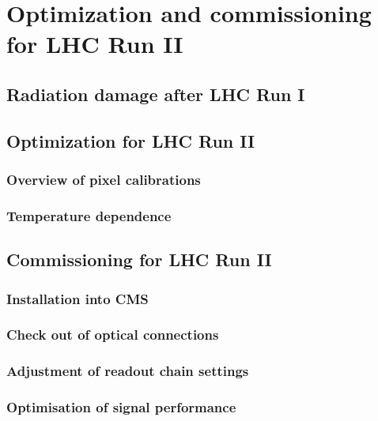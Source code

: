 \chapter{Optimization and commissioning for LHC Run II}

\section{Radiation damage after LHC Run I}
\section{Optimization for LHC Run II}
\subsection{Overview of pixel calibrations}
\subsection{Temperature dependence}

\section{Commissioning for LHC Run II}
\subsection{Installation into CMS}
\subsection{Check out of optical connections}
\subsection{Adjustment of readout chain settings}
\subsection{Optimisation of signal performance}
